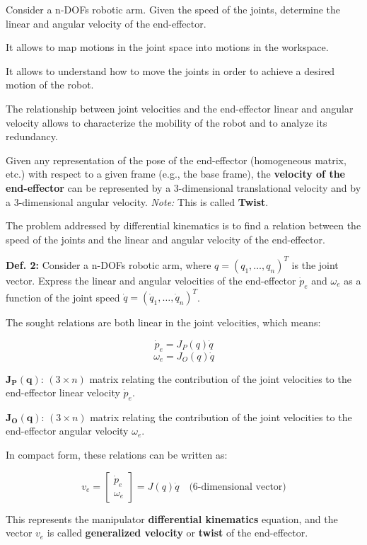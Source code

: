 Consider a n-DOFs robotic arm. Given the speed of the joints, determine the linear and angular velocity of the end-effector.

It allows to map motions in the joint space into motions in the workspace.

It allows to understand how to move the joints in order to achieve a desired motion of the robot.

The relationship between joint velocities and the end-effector linear and angular velocity allows to characterize the mobility of the robot and to analyze its redundancy.

Given any representation of the pose of the end-effector (homogeneous matrix, etc.) with respect to a given frame (e.g., the base frame), the \textbf{velocity of the end-effector} can be represented by a 3-dimensional translational velocity and by a 3-dimensional angular velocity. \textit{Note:} This is called \textbf{Twist}.
  
The problem addressed by differential kinematics is to find a relation between the speed of the joints and the linear and angular velocity of the end-effector.

\textbf{Def. 2:} Consider a n-DOFs robotic arm, where $q = (q_1, \dots, q_n)^T$ is the joint vector. Express the linear and angular velocities of the end-effector $\dot{p}_e$ and $\omega_e$ as a function of the joint speed $\dot{q} = (\dot{q}_1, \dots, \dot{q}_n)^T$.

The sought relations are both linear in the joint velocities, which means:

\[
\dot{p}_e = J_P(q) \dot{q}
\]
\[
\omega_e = J_O(q) \dot{q}
\]

$\mathbf{J_P(q)}$: $(3 \times n)$ matrix relating the contribution of the joint velocities to the end-effector linear velocity $\dot{p}_e$.

$\mathbf{J_O(q)}$: $(3 \times n)$ matrix relating the contribution of the joint velocities to the end-effector angular velocity $\omega_e$.

In compact form, these relations can be written as:

\[
v_e = 
\begin{bmatrix}
\dot{p}_e \\
\omega_e
\end{bmatrix}
= J(q) \dot{q}
\quad\text{(6-dimensional vector)}
\]

This represents the manipulator \textbf{differential kinematics} equation, and the vector $v_e$ is called \textbf{generalized velocity} or \textbf{twist} of the end-effector.

